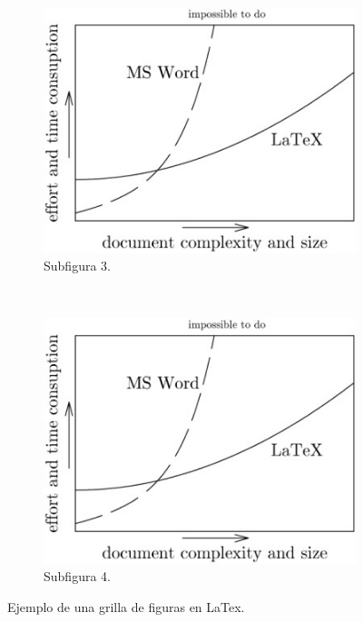 \begin{figure}[!htbp]
\begin{subfigure}[b]{0.45\textwidth}
    \end{subfigure}
    \begin{subfigure}[b]{0.45\textwidth}
            \includegraphics[width=\textwidth]{capitulo-ej/graphics/ejemplo-1.jpg}
            \caption{Subfigura 3.}
    \end{subfigure}
    ~~~~
    \begin{subfigure}[b]{0.45\textwidth}
            \includegraphics[width=\textwidth]{capitulo-ej/graphics/ejemplo-1.jpg}
            \caption{Subfigura 4.}

    \end{subfigure}
    \caption{\label{fig:ejemplo-fig-grilla}Ejemplo de una grilla de figuras en LaTex.}

\end{figure}

